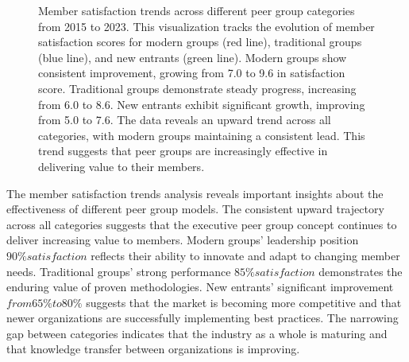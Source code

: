 \documentclass[conference]{IEEEtran}
\begin{document}
\begin{figure}[t]
\centering
{}
\caption{Member satisfaction trends across different peer group categories from 2015 to 2023. 
This visualization tracks the evolution of member satisfaction scores for modern groups (red line), 
traditional groups (blue line), and new entrants (green line). Modern groups show consistent 
improvement, growing from 7.0 to 9.6 in satisfaction score. Traditional groups demonstrate steady 
progress, increasing from 6.0 to 8.6. New entrants exhibit significant growth, improving from 5.0 
to 7.6. The data reveals an upward trend across all categories, with modern groups maintaining a 
consistent lead. This trend suggests that peer groups are increasingly effective in delivering 
value to their members.}
\label{fig:satisfaction_trends}
\end{figure}

The member satisfaction trends analysis reveals important insights about the effectiveness of different peer group models. The consistent upward trajectory across all categories suggests that the executive peer group concept continues to deliver increasing value to members. Modern groups' leadership position \(90\% satisfaction\) reflects their ability to innovate and adapt to changing member needs. Traditional groups' strong performance \(85\% satisfaction\) demonstrates the enduring value of proven methodologies. New entrants' significant improvement \(from 65\% to 80\%\) suggests that the market is becoming more competitive and that newer organizations are successfully implementing best practices. The narrowing gap between categories indicates that the industry as a whole is maturing and that knowledge transfer between organizations is improving.
\end{document}
